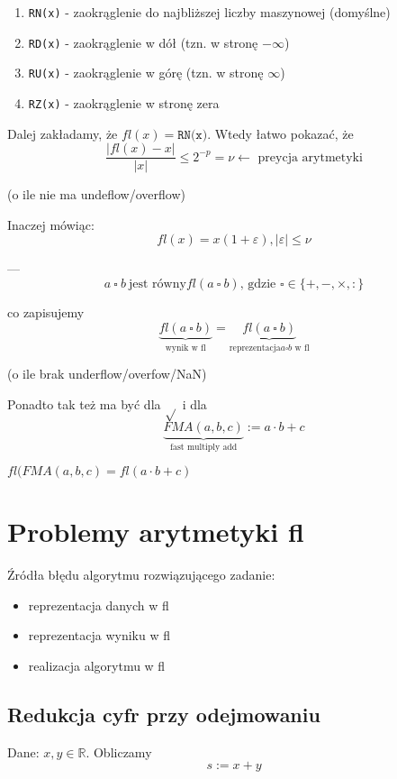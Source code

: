 \documentclass[hidelinks,a4paper,fleqn,oneside]{book}
\newcommand{\RR}{\mathbb{R}}
\begin{document}
\begin{enumerate}
	\item \texttt{RN(x)} - zaokrąglenie do najbliższej liczby maszynowej (domyślne)
	\item \texttt{RD(x)} - zaokrąglenie w dół (tzn. w stronę $-\infty$)
	\item \texttt{RU(x)} - zaokrąglenie w górę (tzn. w stronę $\infty$)
	\item \texttt{RZ(x)} - zaokrąglenie w stronę zera
\end{enumerate}

Dalej zakładamy, że $fl(x) = \texttt{RN(x)}$. Wtedy łatwo pokazać, że 
\[
	\frac{|fl(x) - x|}{|x|} \leq 2^{-p} = \nu \leftarrow \textrm{ preycja arytmetyki}
\]

(o ile nie ma undeflow/overflow)

Inaczej mówiąc:
\[
	fl(x) = x(1 + \varepsilon), |\varepsilon| \leq \nu
\]

---
\[
	a\ \square\ b\ \textrm{jest równy} fl(a\ \square\ b)\textrm{, gdzie }\square \in \{+, -, \times, :\}
\]

co zapisujemy
\[
	\underbrace{fl(a\ \square\ b)}_{\textrm{wynik w fl}} = \underbrace{fl(a\ \square\ b)}_{\textrm{reprezentacja} a \square b \textrm{ w fl}}
\]

(o ile brak underflow/overfow/NaN)

Ponadto tak też ma być dla $\sqrt{}$ i dla
\[
	\underbrace{FMA(a, b, c)}_{\textrm{fast multiply add}} := a \cdot b + c
\]

$fl(FMA(a, b, c) = fl(a \cdot b + c)$

\section{Problemy arytmetyki fl}

Źródła błędu algorytmu rozwiązującego zadanie:
\begin{itemize}
	\item reprezentacja danych w fl
	\item reprezentacja wyniku w fl
	\item realizacja algorytmu w fl
\end{itemize}


\subsection{Redukcja cyfr przy odejmowaniu}

Dane: $x, y \in \RR$. Obliczamy
\[
	s := x + y
\]
\end{document}

